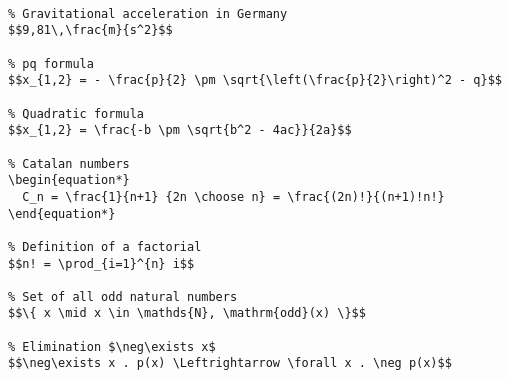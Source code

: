 \begin{verbatim}

% Gravitational acceleration in Germany
$$9,81\,\frac{m}{s^2}$$

% pq formula
$$x_{1,2} = - \frac{p}{2} \pm \sqrt{\left(\frac{p}{2}\right)^2 - q}$$

% Quadratic formula
$$x_{1,2} = \frac{-b \pm \sqrt{b^2 - 4ac}}{2a}$$

% Catalan numbers
\begin{equation*}
  C_n = \frac{1}{n+1} {2n \choose n} = \frac{(2n)!}{(n+1)!n!}
\end{equation*}

% Definition of a factorial
$$n! = \prod_{i=1}^{n} i$$

% Set of all odd natural numbers
$$\{ x \mid x \in \mathds{N}, \mathrm{odd}(x) \}$$

% Elimination $\neg\exists x$
$$\neg\exists x . p(x) \Leftrightarrow \forall x . \neg p(x)$$
\end{verbatim}
